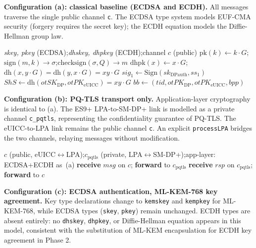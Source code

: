 \documentclass[a4paper,fleqn]{cas-sc}
\begin{document}
\noindent\textbf{Configuration (a): classical baseline (ECDSA and ECDH).}
All messages traverse the single public channel \texttt{c}. The ECDSA
type system models EUF-CMA security (forgery requires the secret key);
the ECDH equation models the Diffie-Hellman group law.

\begin{algorithm}[H]
\caption{Config (a): ECDSA + ECDH (classical baseline)}
\footnotesize
\begin{algorithmic}[1]
\Statex \textit{skey, pkey} (ECDSA);\enspace \textit{dhskey, dhpkey} (ECDH);\enspace channel $c$ (public)
\State $\mathrm{pk}(k)\gets k{\cdot}G$;\enspace $\mathrm{sign}(m,k)\to\sigma$;\enspace $\mathrm{checksign}(\sigma,Q)\to m$
\State $\mathrm{dhpk}(x)\gets x{\cdot}G$;\enspace $\mathrm{dh}(x,y{\cdot}G)=\mathrm{dh}(y,x{\cdot}G)=xy{\cdot}G$
\State $\mathit{sig}_1\gets\mathrm{Sign}(\mathit{sk}_{\mathrm{DPauth}},\mathit{ss}_1)$ 
\State $\mathit{ShS}\gets\mathrm{dh}(\mathit{otSK}_{\mathrm{DP}},\mathit{otPK}_{\mathrm{eUICC}})=xy{\cdot}G$ 
\State $\mathit{bb}\gets(\mathit{tid},\mathit{otPK}_{\mathrm{DP}},\mathit{otPK}_{\mathrm{eUICC}},\mathit{bpp})$ 
\end{algorithmic}
\end{algorithm}

\noindent\textbf{Configuration (b): PQ-TLS transport only.}
Application-layer cryptography is identical to (a). The ES9+
LPA-to-SM-DP+ link is modelled as a private channel \texttt{c\_pqtls},
representing the confidentiality guarantee of PQ-TLS. The eUICC-to-LPA
link remains the public channel \texttt{c}. An explicit
\texttt{processLPA} bridges the two channels, relaying messages
without modification.

\begin{algorithm}[H]
\caption{Config (b): PQ-TLS channel model}
\footnotesize
\begin{algorithmic}[1]
\Statex $c$ (public, eUICC$\leftrightarrow$LPA);\enspace $c_{\mathrm{pqtls}}$ (private, LPA$\leftrightarrow$SM-DP+);\enspace app-layer: ECDSA+ECDH as~(a)
\State \textbf{receive} $\mathit{msg}$ on $c$; \textbf{forward} to $c_{\mathrm{pqtls}}$ 
\State \textbf{receive} $\mathit{rsp}$ on $c_{\mathrm{pqtls}}$; \textbf{forward} to $c$ 
\end{algorithmic}
\end{algorithm}

\noindent\textbf{Configuration (c): ECDSA authentication, ML-KEM-768 key agreement.}
Key type declarations change to \texttt{kemskey} and \texttt{kempkey} for ML-KEM-768,
while ECDSA types (\texttt{skey}, \texttt{pkey}) remain unchanged.
ECDH types are absent entirely: no \texttt{dhskey}, \texttt{dhpkey}, or
Diffie-Hellman equation appears in this model, consistent with the substitution
of ML-KEM encapsulation for ECDH key agreement in Phase 2.
\end{document}

